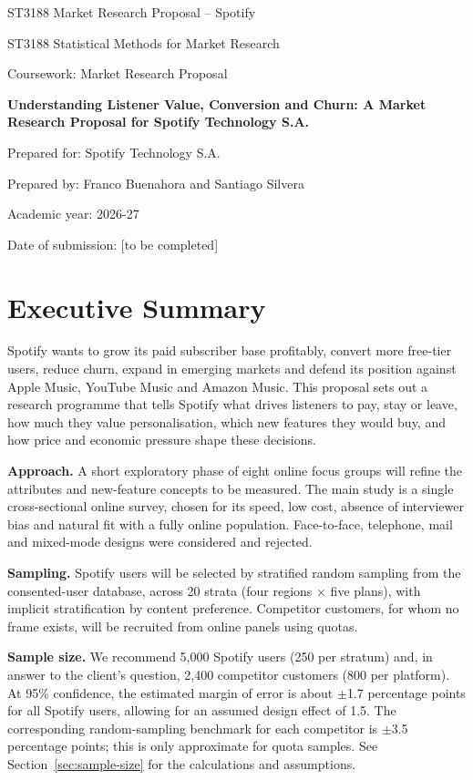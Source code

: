 \documentclass[11pt,a4paper]{article}
\begin{document}
\begin{titlepage}
\centering

ST3188 Market Research Proposal – Spotify\par\vspace{1cm}
ST3188 Statistical Methods for Market Research\par
Coursework: Market Research Proposal\par\vspace{2cm}
{\LARGE\bfseries Understanding Listener Value, Conversion and Churn: A Market Research Proposal for Spotify Technology S.A.\par}\vspace{2cm}
Prepared for: Spotify Technology S.A.\par
Prepared by: Franco Buenahora and Santiago Silvera\par
Academic year: 2026-27\par
Date of submission: [to be completed]\par
\end{titlepage}
\tableofcontents
\clearpage
\section{Executive Summary}
Spotify wants to grow its paid subscriber base profitably, convert more free-tier users, reduce churn, expand in emerging markets and defend its position against Apple Music, YouTube Music and Amazon Music. This proposal sets out a research programme that tells Spotify what drives listeners to pay, stay or leave, how much they value personalisation, which new features they would buy, and how price and economic pressure shape these decisions.

\textbf{Approach.} A short exploratory phase of eight online focus groups will refine the attributes and new-feature concepts to be measured. The main study is a single cross-sectional online survey, chosen for its speed, low cost, absence of interviewer bias and natural fit with a fully online population. Face-to-face, telephone, mail and mixed-mode designs were considered and rejected.

\textbf{Sampling.} Spotify users will be selected by stratified random sampling from the consented-user database, across 20 strata (four regions \(\times\) five plans), with implicit stratification by content preference. Competitor customers, for whom no frame exists, will be recruited from online panels using quotas.

\textbf{Sample size.} We recommend 5,000 Spotify users (250 per stratum) and, in answer to the client's question, 2,400 competitor customers (800 per platform). At 95\% confidence, the estimated margin of error is about \(\pm\)1.7 percentage points for all Spotify users, allowing for an assumed design effect of 1.5. The corresponding random-sampling benchmark for each competitor is \(\pm\)3.5 percentage points; this is only approximate for quota samples. See Section~\ref{sec:sample-size} for the calculations and assumptions.
\end{document}
